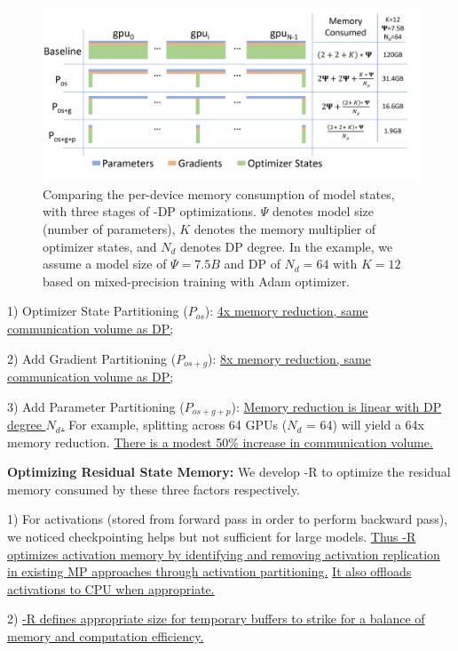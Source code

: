 \begin{figure}[t!]
 \begin{center}
 \includegraphics[width=1.0\columnwidth]{memory-consumption-v4.PNG}
 \caption{Comparing the per-device memory consumption of model states, with three stages of \name-DP optimizations. $\Psi$ denotes model size (number of parameters), $K$ denotes the memory multiplier of optimizer states, and $N_d$ denotes DP degree.  In the example, we assume a model size of $\Psi=7.5B$ and DP of $N_d=64$ with $K=12$ based on mixed-precision training with Adam optimizer. } 
 \label{fig:memory-consumption}
 \end{center}
\end{figure}

1) Optimizer State Partitioning ($P_{os}$): \uline{4x memory reduction, same communication volume as DP;}

2) Add Gradient Partitioning ($P_{os+g}$): \uline{8x memory reduction, same communication volume as DP;} 

3) Add Parameter Partitioning ($P_{os+g+p}$): \uline{Memory reduction is linear with DP degree $N_d$.} For example, splitting across 64 GPUs ($N_d$ = 64) will yield a 64x memory reduction. \uline{There is a modest 50\% increase in communication volume.}

{\bf Optimizing Residual State Memory:}
We develop \name-R to optimize the residual memory consumed by these three factors respectively.  

1) For activations (stored from forward pass in order to perform backward pass), we noticed checkpointing \cite{DBLP:journals/corr/ChenXZG16} helps but not sufficient for large models.  
\uline{Thus \name-R optimizes activation memory by identifying and removing activation replication in existing MP approaches through activation partitioning.} \uline{It also offloads activations to CPU when appropriate.}

2) \uline{\name-R defines appropriate size for temporary buffers to strike for a balance of memory and computation efficiency.}

